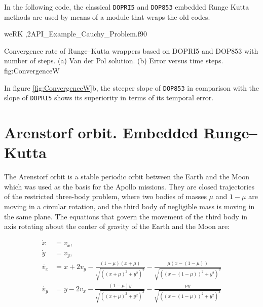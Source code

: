  In the following code, the classical \verb|DOPRI5| and \verb|DOP853| embedded Runge Kutta methods are used by means of a module that wraps the old codes.  
 
 \vspace{0.5cm} 
 {weRK}
 {,2}{API_Example_Cauchy_Problem.f90}
 
 \twographs
 {}
 {}
 {Convergence rate of Runge--Kutta wrappers based on DOPRI5 and DOP853 with number of steps.
     (a) Van der Pol solution.
     (b) Error versus time steps. }
 {fig:ConvergenceW}  
 
 
 In figure \ref{fig:ConvergenceW}b, the steeper slope of \verb|DOP853| in comparison with the  slope of \verb|DOPRI5| shows its superiority in terms of  its temporal error.
 \newpage                            
 \section{Arenstorf orbit. Embedded Runge--Kutta}
  The Arenstorf orbit is a stable periodic orbit between the Earth and the Moon which was used as the basis for the Apollo missions.
  They are closed trajectories of the restricted three-body problem, where two bodies of masses $\mu$ and $1 - \mu$ are moving in a circular rotation, and the third body of negligible mass is moving in the same plane. The equations
  that govern the movement of the third body in axis rotating about the center of gravity of the Earth and the Moon are: 
  
  
  
  \begin{align*}
      \dot{x} & = v_{x}, \\
      \dot{y} & = v_{y}, \\
      \dot{v_x} & =  x + 2 v_{y} - \frac{\left(1 - \mu \right) \left(x+\mu\right)}{\sqrt{\left( \left( x+\mu\right) ^2 + y^2\right) ^3}} -\frac{\mu\left(x-\left(1-\mu\right)\right)}{\sqrt{\left( \left( x-\left( 1-\mu\right) \right) ^2+y^2\right) ^3}} \\
      \dot{v_y} & = y - 2 v_{x} - \frac{\left(1 - \mu \right) y}{\sqrt{\left( \left( x+\mu\right) ^2 + y^2\right) ^3}} -\frac{\mu y}{\sqrt{\left( \left( x-\left( 1-\mu\right) \right) ^2+y^2\right) ^3}}  \\
  \end{align*}
  
